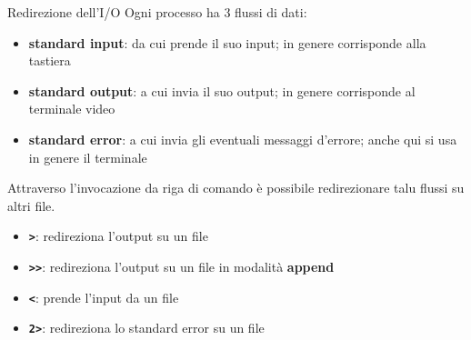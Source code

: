 \documentclass{beamer}
\begin{document}
    \begin{frame}{Redirezione dell'I/O}
        Ogni processo ha 3 flussi di dati:

        \begin{itemize}
            \item \textbf{standard input}: da cui prende il suo input; in genere corrisponde alla tastiera
            \item \textbf{standard output}: a cui invia il suo output; in genere corrisponde al terminale video
            \item \textbf{standard error}: a cui invia gli eventuali messaggi d'errore; anche qui si usa in genere il terminale
        \end{itemize}

        Attraverso l'invocazione da riga di comando è possibile
        redirezionare talu flussi su altri file.

        \begin{itemize}
            \item \texttt{\textbf{>}}: redireziona l'output su un file
            \item \texttt{\textbf{>>}}: redireziona l'output su un file in modalità \textbf{append}
            \item \texttt{\textbf{<}}: prende l'input da un file
            \item \texttt{\textbf{2>}}: redireziona lo standard error su un file
        \end{itemize}
    \end{frame}
\end{document}
